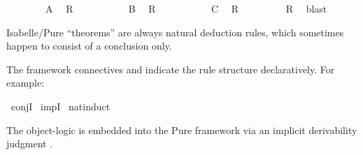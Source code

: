 \begin{isabellebody}
\isanewline
\ \ \isamarkupfalse%
\isanewline
\ \ \isamarkupfalse%
\ \isamarkupfalse%
\ A\ \isamarkupfalse%
\ R\ \isamarkupfalse%
\ \isamarkupfalse%
\isanewline
\ \ \isamarkupfalse%
\isanewline
\ \ \isamarkupfalse%
\ \isamarkupfalse%
\ B\ \isamarkupfalse%
\ R\ \isamarkupfalse%
\ \isamarkupfalse%
\isanewline
\ \ \isamarkupfalse%
\isanewline
\ \ \isamarkupfalse%
\ \isamarkupfalse%
\ C\ \isamarkupfalse%
\ R\ \isamarkupfalse%
\ \isamarkupfalse%
\isanewline
\ \ \isamarkupfalse%
\isanewline
\ \ \isamarkupfalse%
\ R\ \isamarkupfalse%
\ blast\ \ %
%
\endisatagproof
{\isafoldproof}%
%
\isadelimproof
%
\endisadelimproof
\isanewline
{}\isamarkupfalse%
%
\isamarkuptrue%
%
\isamarkuptrue%
%
\begin{isamarkuptext}%
Isabelle/Pure ``theorems'' are always natural deduction rules,
  which sometimes happen to consist of a conclusion only.

  The framework connectives  and  indicate the
  rule structure declaratively.  For example:%
\end{isamarkuptext}%
\isamarkuptrue%
\isamarkupfalse%
\ conjI\isanewline
{}\isamarkupfalse%
\ impI\isanewline
{}\isamarkupfalse%
\ nat{}induct%
\begin{isamarkuptext}%
The object-logic is embedded into the Pure framework via an implicit
  derivability judgment .


\end{isamarkuptext}
\end{isabellebody}
